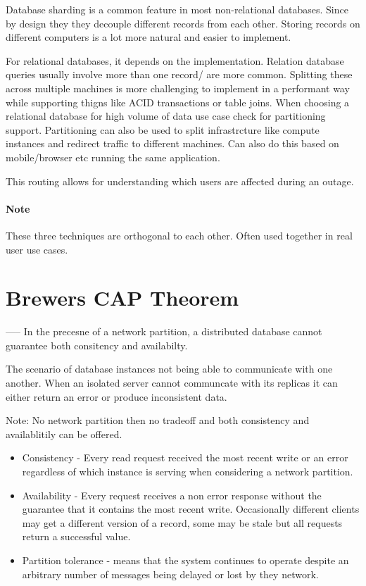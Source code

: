 \documentclass[a4paper, 11pt]{book}
\begin{document}
    Database sharding is a common feature in most non-relational databases.
    Since by design they they decouple different records from each other.
    Storing records on different computers is a lot more natural and easier to implement.

    For relational databases, it depends on the implementation.
    Relation database queries usually involve more than one record/ are more common.
    Splitting these across multiple machines is more challenging to implement in a performant way while supporting thigns like ACID transactions or table joins.
    When choosing a relational database for high volume of data use case check for partitioning support.
    Partitioning can also be used to split infrastrcture like compute instances and redirect traffic to different machines.
    Can also do this based on mobile/browser etc running the same application.

    This routing allows for understanding which users are affected during an outage.

    \paragraph{Note}
    These three techniques are orthogonal to each other. Often used together in real user use cases.

    \section{Brewers CAP Theorem}

----- In the precesne of a network partition, a distributed database cannot guarantee both consitency and availabilty.

    The scenario of database instances not being able to communicate with one another.
    When an isolated server cannot communcate with its replicas it can either return an error or produce inconsistent data.

    Note: No network partition then no tradeoff and both consistency and availablitily can be offered.

    \begin{itemize}
        \item Consistency - Every read request received the most recent write or an error regardless of which instance is serving when considering a network partition.
        \item Availability - Every request receives a non error response without the guarantee that it contains the most recent write.
        Occasionally different clients may get a different version of a record, some may be stale but all requests return a successful value.
        \item Partition tolerance - means that the system continues to operate despite an arbitrary number of messages being delayed or lost by they network.
    \end{itemize}
\end{document}
